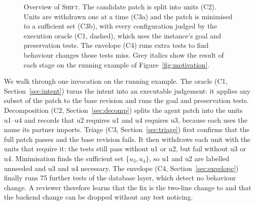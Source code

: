 \documentclass[a4paper,fleqn]{cas-sc}
\newcommand{\tool}{\textsc{Shift}}
\newcommand{\code}[1]{\texttt{\detokenize{#1}}}
\newcommand{\lab}[1]{\textsf{#1}}
\begin{document}
\begin{figure}[pos=htbp]
{}
\caption{Overview of \tool{}. The candidate patch is split into units (C2). Units are withdrawn one at a time (C3a) and the patch is minimised to a sufficient set (C3b), with every configuration judged by the execution oracle (C1, dashed), which uses the instance's goal and preservation tests. The envelope (C4) runs extra tests to find behaviour changes those tests miss. Grey italics show the result of each stage on the running example of Figure~\ref{fig:motivation}.}
\label{fig:overview}
\end{figure}



We walk through one invocation on the running example. The oracle (C1, Section~\ref{sec:intent}) turns the intent into an executable judgement: it applies any subset of the patch to the base revision and runs the goal and preservation tests. Decomposition (C2, Section~\ref{sec:decomp}) splits the agent patch into the units u1--u4 and records that u2 requires u1 and u4 requires u3, because each uses the name its partner imports. Triage (C3, Section~\ref{sec:triage}) first confirms that the full patch passes and the base revision fails. It then withdraws each unit with the units that require it: the tests still pass without u1 or u2, but fail without u3 or u4. Minimisation finds the sufficient set $\{u_3,u_4\}$, so u1 and u2 are labelled unneeded and u3 and u4 necessary. The envelope (C4, Section~\ref{sec:envelope}) finally runs 75 further tests of the database layer, which detect no behaviour change. A reviewer therefore learns that the fix is the two-line change to \code{Field.get_prep_value} and that the backend change can be dropped without any test noticing.
\end{document}
